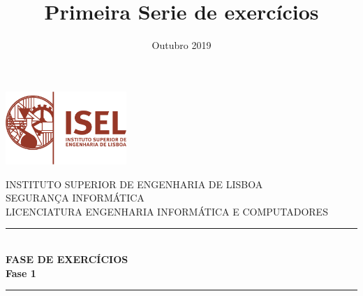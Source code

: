 \documentclass[11pt]{report}
\title{Primeira Serie de exercícios}
\date{Outubro 2019}
\begin{document}

\begin{titlepage} 

\newcommand{\HRule}{\rule{\linewidth}{0.5mm}} %


\includegraphics[width=130pt, keepaspectratio=true]{img/logo_isel}\\[1cm] %
\center %
 

\textsc{\LARGE INSTITUTO SUPERIOR DE ENGENHARIA DE LISBOA}\\[1.5cm] %
\vskip 40pt
\textsc{\Large SEGURANÇA INFORMÁTICA}\\[0.5cm] %
\textsc{\large LICENCIATURA ENGENHARIA INFORMÁTICA E COMPUTADORES}\\[0.5cm] %
\vskip 40pt


\HRule \\[0.4cm]
{ \LARGE \bfseries FASE DE EXERCÍCIOS }\\[0.4cm]
{ \huge \bfseries Fase 1}\\[0.4cm] %
\HRule \\[1.5cm]
 

\end{titlepage}
\end{document}
